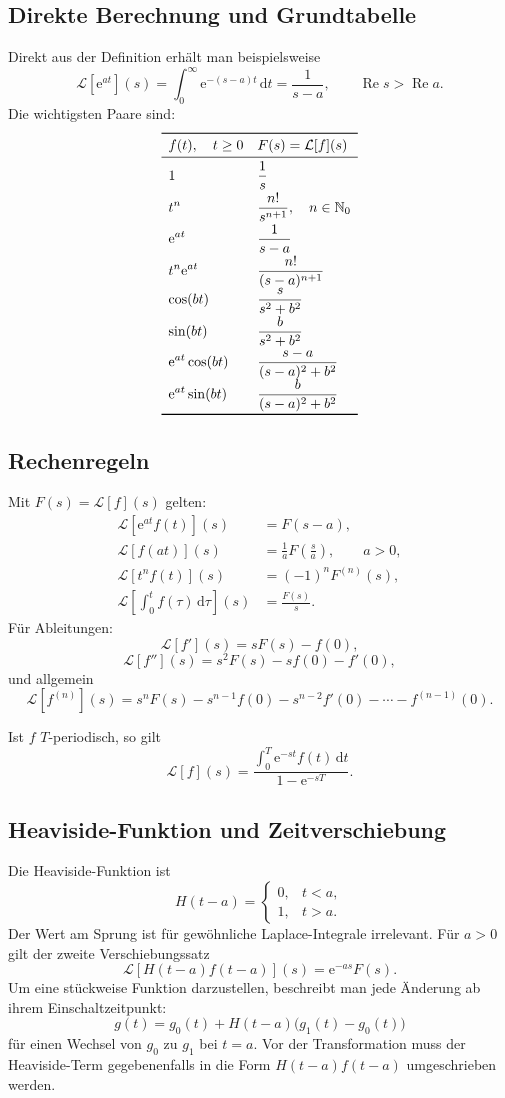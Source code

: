 \documentclass[11pt,a4paper]{article}
\newcommand{\N}{\mathbb N}
\newcommand{\ee}{\mathrm e}
\newcommand{\dd}{\,\mathrm d}
\newcommand{\Ree}{\operatorname{Re}}
\newcommand{\1}{\mathbf 1}
\begin{document}
{\subsection{Direkte Berechnung und Grundtabelle}
Direkt aus der Definition erhält man beispielsweise
\[
\mathcal L[\ee^{at}](s)
=\int_0^\infty\ee^{-(s-a)t}\dd t
=\frac1{s-a},\qquad \Ree s>\Ree a.
\]
Die wichtigsten Paare sind:
\[
\begin{array}{>{\displaystyle}l>{\displaystyle}l}
\toprule
f(t),\quad t\ge0 & F(s)=\mathcal L[f](s)\\
\midrule
1 & \dfrac1s\\[2mm]
t^n & \dfrac{n!}{s^{n+1}},\quad n\in\N_0\\[2mm]
\ee^{at} & \dfrac1{s-a}\\[2mm]
t^n\ee^{at} & \dfrac{n!}{(s-a)^{n+1}}\\[2mm]
\cos(bt) & \dfrac{s}{s^2+b^2}\\[2mm]
\sin(bt) & \dfrac{b}{s^2+b^2}\\[2mm]
\ee^{at}\cos(bt) & \dfrac{s-a}{(s-a)^2+b^2}\\[2mm]
\ee^{at}\sin(bt) & \dfrac{b}{(s-a)^2+b^2}\\
\bottomrule
\end{array}
\]

\subsection{Rechenregeln}
Mit $F(s)=\mathcal L[f](s)$ gelten:
\[
\begin{aligned}
\mathcal L[\ee^{at}f(t)](s)&=F(s-a),\\
\mathcal L[f(at)](s)&=\frac1aF\!\left(\frac{s}{a}\right),
\qquad a>0,\\
\mathcal L[t^nf(t)](s)&=(-1)^nF^{(n)}(s),\\
\mathcal L\!\left[\int_0^t f(\tau)\dd\tau\right](s)&=\frac{F(s)}s.
\end{aligned}
\]
Für Ableitungen:
\[
\mathcal L[f'](s)=sF(s)-f(0),
\]
\[
\mathcal L[f''](s)=s^2F(s)-sf(0)-f'(0),
\]
und allgemein
\[
\mathcal L[f^{(n)}](s)
=s^nF(s)-s^{n-1}f(0)-s^{n-2}f'(0)-\cdots-f^{(n-1)}(0).
\]

Ist $f$ $T$-periodisch, so gilt
\[
\mathcal L[f](s)
=\frac{\displaystyle\int_0^T\ee^{-st}f(t)\dd t}
{1-\ee^{-sT}}.
\]

\subsection{Heaviside-Funktion und Zeitverschiebung}
Die Heaviside-Funktion ist
\[
H(t-a)=
\begin{cases}
0,&t<a,\\
1,&t>a.
\end{cases}
\]
Der Wert am Sprung ist für gewöhnliche Laplace-Integrale irrelevant. Für $a>0$ gilt
der zweite Verschiebungssatz
\[
\mathcal L[H(t-a)f(t-a)](s)
=\ee^{-as}F(s).
\]
Um eine stückweise Funktion darzustellen, beschreibt man jede Änderung ab ihrem
Einschaltzeitpunkt:
\[
g(t)=g_0(t)+H(t-a)\bigl(g_1(t)-g_0(t)\bigr)
\]
für einen Wechsel von $g_0$ zu $g_1$ bei $t=a$. Vor der Transformation muss der
Heaviside-Term gegebenenfalls in die Form $H(t-a)f(t-a)$ umgeschrieben werden.

}
\end{document}
